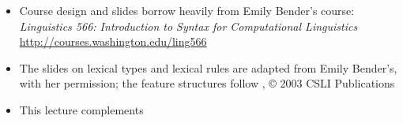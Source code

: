\documentclass[a4paper,landscape,headrule,footrule]{foils}
\begin{document}

\begin{itemize}
\item Course design and slides borrow heavily from Emily Bender's course:
\textit{Linguistics 566: Introduction to Syntax for Computational Linguistics}
\\ \url{http://courses.washington.edu/ling566}
\item The slides on lexical types and lexical rules are adapted from
  Emily Bender's, with her permission; the feature structures follow
  \citet{sag:wasow:bender:2003}, \copyright{} 2003 CSLI Publications
\item This lecture complements \citet[Chapter 8]{sag:wasow:bender:2003}
\end{itemize}


%



\end{document}
